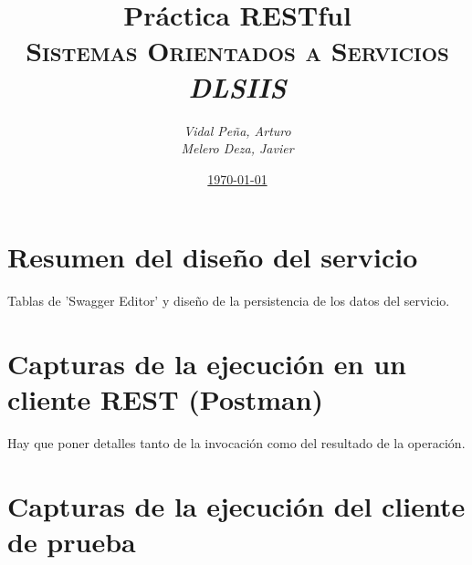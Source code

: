 \documentclass[12pt,a4paper, spanish]{article}
\title{\textbf{Práctica RESTful} \\
       \textsc{Sistemas Orientados a Servicios} \\
       \emph{DLSIIS}}
\author{\emph{Vidal Peña, Arturo}\\
        \emph{Melero Deza, Javier}}
\date{\underline{\today}}
\begin{document}
\maketitle
\thispagestyle{empty}
\renewcommand*\contentsname{Índice de contenidos}
\tableofcontents
\pagebreak


\section{Resumen del diseño del servicio}
Tablas de 'Swagger Editor' y diseño de la persistencia de los datos del servicio.

\newpage
\section{Capturas de la ejecución en un cliente REST (Postman)}
Hay que poner detalles tanto de la invocación como del resultado de la operación.

\newpage
\section{Capturas de la ejecución del cliente de prueba}
\end{document}
